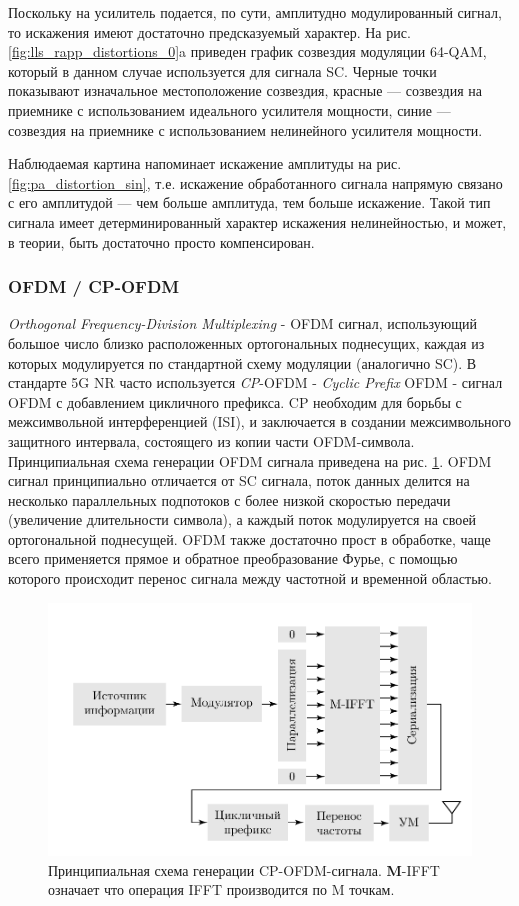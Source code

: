Поскольку на усилитель подается, по сути, амплитудно модулированный сигнал,
то искажения имеют достаточно предсказуемый характер. На рис.
\ref{fig:lls_rapp_distortions_0}a приведен график созвездия модуляции
64-QAM, который в данном случае используется для сигнала SC. Черные точки
показывают изначальное местоположение созвездия, красные — созвездия на
приемнике с использованием идеального усилителя мощности, синие — созвездия
на приемнике с использованием нелинейного усилителя мощности. 

Наблюдаемая картина напоминает искажение амплитуды на рис.
\ref{fig:pa_distortion_sin}, т.е. искажение обработанного сигнала напрямую
связано с его амплитудой — чем больше амплитуда, тем больше искажение.
Такой тип сигнала имеет детерминированный характер искажения нелинейностью,
и может, в теории, быть достаточно просто компенсирован.


\subsubsection{OFDM / CP-OFDM}
\textit{Orthogonal Frequency-Division Multiplexing} - OFDM сигнал,
использующий большое число близко расположенных ортогональных поднесущих,
каждая из которых модулируется по стандартной схему модуляции (аналогично
SC). В стандарте 5G NR часто используется \textit{CP}-OFDM - \textit{Cyclic
Prefix} OFDM - сигнал OFDM с добавлением цикличного префикса. CP необходим
для борьбы с межсимвольной интерференцией (ISI), и заключается в создании
межсимвольного защитного интервала, состоящего из копии части
OFDM-символа. Принципиальная схема генерации OFDM сигнала приведена на рис.
\ref{fig:ofdm_scheme}. OFDM сигнал принципиально отличается от SC сигнала,
поток данных делится на несколько параллельных подпотоков с более низкой
скоростью передачи (увеличение длительности символа), а каждый поток
модулируется на своей ортогональной поднесущей. OFDM также достаточно прост
в обработке, чаще всего применяется прямое и обратное преобразование Фурье,
с помощью которого происходит перенос сигнала между частотной и временной
областью.
\begin{figure}[h!]
    \centering
    \includegraphics[scale=1]{figs/ofdm_scheme.pdf}
    \caption{Принципиальная схема генерации CP-OFDM-сигнала.
    \textbf{M}-IFFT означает что операция IFFT производится по M точкам.}
    \label{fig:ofdm_scheme}
\end{figure}


